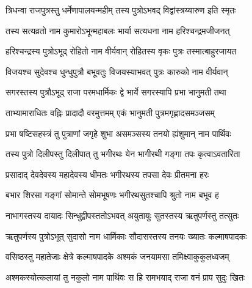 

\vakta{}
\shrota{}
\translink{}

\storymeta

\twolineshloka
{त्रिधन्वा राजपुत्रस्तु धर्मेणापालयन्महीम्}
{तस्य पुत्रोऽभवद् विद्वांस्त्रय्यारुण इति स्मृतः} %

\twolineshloka
{तस्य सत्यव्रतो नाम कुमारोऽभून्महाबलः}
{भार्या सत्यधना नाम हरिश्चन्द्रमजीजनत्} %

\twolineshloka
{हरिश्चन्द्रस्य पुत्रोऽभूद् रोहितो नाम वीर्यवान्}
{रोहितस्य वृकः पुत्रः तस्मात्बाहुरजायत} %

{विजयश्च सुदेवश्च धुन्धुपुत्रौ बभूवतुः}
{विजयस्याभवत् पुत्रः कारुको नाम वीर्यवान्}

\twolineshloka
{सगरस्तस्य पुत्रौऽभूद् राजा परमधार्मिकः}
{द्वे भार्ये सगरस्यापि प्रभा भानुमती तथा} %

\twolineshloka
{ताभ्यामाराधितः वह्निः प्रादादौ वरमुत्तमम्}
{एकं भानुमती पुत्रमगृह्णादसमञ्जसम्} %

\twolineshloka
{प्रभा षष्टिसहस्त्रं तु पुत्राणां जगृहे शुभा}
{असमञ्सस्य तनयो ह्यंशुमान् नाम पार्थिवः} %

\twolineshloka
{तस्य पुत्रो दिलीपस्तु दिलीपात् तु भगीरथः}
{येन भागीरथी गङ्गा तपः कृत्वाऽवतारिता} %

\twolineshloka
{प्रसादाद् देवदेवस्य महादेवस्य धीमतः}
{भगीरथस्य तपसा देवः प्रीतमना हरः} %

\twolineshloka
{बभार शिरसा गङ्गां सोमान्ते सोमभूषणः}
{भगीरथसुतश्चापि श्रुतो नाम बभूव ह} %

\twolineshloka
{नाभागस्तस्य दायादः सिन्धुद्वीपस्ततोऽभवत्}
{अयुतायुः सुतस्तस्य ऋतुपर्णस्तु तत्सुतः} %

\twolineshloka
{ऋतुपर्णस्य पुत्रोऽभूत् सुदासो नाम धार्मिकाः}
{सौदासस्तस्य तनयः ख्यातः कल्माषपादकः} %

\twolineshloka
{वसिष्ठस्तु महातेजाः क्षेत्रे कल्माषपादके}
{अश्मकं जनयामसा तमिक्ष्वाकुकुलध्वजम्} %

\twolineshloka
{अश्मकस्योत्कलायां तु नकुलो नाम पार्थिवः}
{स हि रामभयाद् राजा वनं प्राप सुदुः खितः} %

